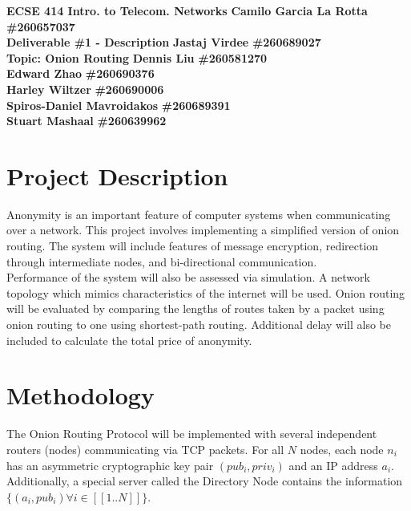 \documentclass[10pt]{article}
\begin{document}
\noindent
\large \textbf{ECSE 414 Intro. to Telecom. Networks} \hfill \textbf{Camilo Garcia La Rotta} \textbf{\#260657037} \\
\large \textbf{Deliverable \#1 - Description}        \hfill \textbf{Jastaj Virdee} \textbf{\#260689027} \\
\large \textbf{Topic: Onion Routing}                 \hfill \textbf{Dennis Liu} \textbf{\#260581270} \\
\text{}                                              \hfill \textbf{Edward Zhao} \textbf{\#260690376}\\
\text{}                                              \hfill \textbf{Harley Wiltzer} \textbf{\#260690006}\\
\text{}                                              \hfill \textbf{Spiros-Daniel Mavroidakos} \textbf{\#260689391}\\
\text{}                                              \hfill \textbf{Stuart Mashaal} \textbf{\#260639962}\\

\section*{Project Description}

Anonymity is an important feature of computer systems when communicating over a network. This project involves implementing a simplified version of onion routing. The system will include features of message encryption, redirection through intermediate nodes, and bi-directional communication. \\

\noindent Performance of the system will also be assessed via simulation. A network topology which mimics characteristics of the internet will be used. Onion routing will be evaluated by comparing the lengths of routes taken by a packet using onion routing to one using shortest-path routing. Additional delay will also be included to calculate the total price of anonymity.

\section*{Methodology}

The Onion Routing Protocol will be implemented with several independent routers (nodes)
communicating via TCP packets.  For all $N$ nodes, each node $n_i$ has
an asymmetric cryptographic key pair $(pub_{i},priv_{i})$ and an IP address $a_i$.  Additionally, a special
server called the Directory Node contains the information $\{(a_i, pub_i) \forall i \in [\![1..N]\!]\}$.\\
\end{document}
